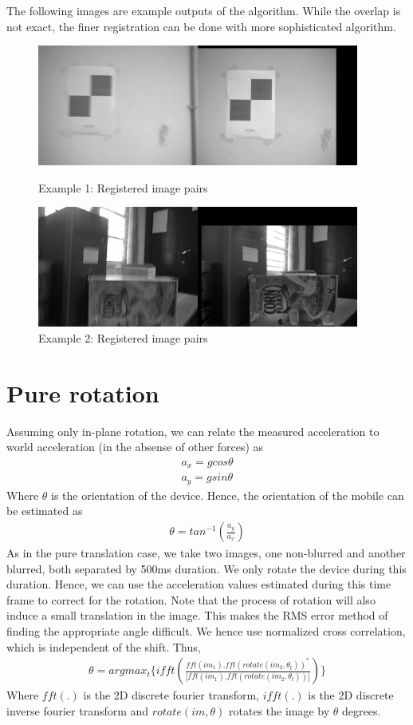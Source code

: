 \documentclass[BTech]{iitmdiss}
\begin{document}
The following images are example outputs of the algorithm. While the overlap
is not exact, the finer registration can be done with more sophisticated
algorithm. 

\begin{figure}[h]
\begin{center}
\includegraphics[width=300pt]{images/imreg/shift/eg1/imreg.png}
\caption{Example 1: Registered image pairs}
\includegraphics[width=300pt]{images/imreg/shift/eg2/imreg.png}
\caption{Example 2: Registered image pairs}
\end{center}
\end{figure}

\section{Pure rotation}
\label{image_registration:pure_rotation}
Assuming only in-plane rotation, we can relate the measured acceleration
to world acceleration (in the absense of other forces) as
\begin{align*}
a_x=gcos\theta\\
a_y=gsin\theta
\end{align*}
Where $\theta$ is the orientation of the device. Hence, the orientation
of the mobile can be estimated as
\begin{align*}
\theta=tan^{-1}(\frac{a_y}{a_x})
\end{align*}
As in the pure translation case, we take two images, one non-blurred and
another blurred, both separated by 500ms duration. We only rotate the 
device during this duration. Hence, we can use the acceleration values
estimated during this time frame to correct for the rotation. Note that
the process of rotation will also induce a small translation in the 
image. This makes the RMS error method of finding the appropriate
angle difficult. We hence use normalized cross correlation, which is 
independent of the shift. Thus,
\begin{align*}
\theta=argmax_t\big\{ifft(\frac{fft(im_1).fft(rotate(im_2,\theta_t))^*}
{|fft(im_1).fft(rotate(im_2,\theta_t))|})\}
\end{align*}
Where $fft(.)$ is the 2D discrete fourier transform, $ifft(.)$ is the 2D 
discrete inverse fourier transform and $rotate(im, \theta)$ rotates the image
by $\theta$ degrees.
\end{document}
